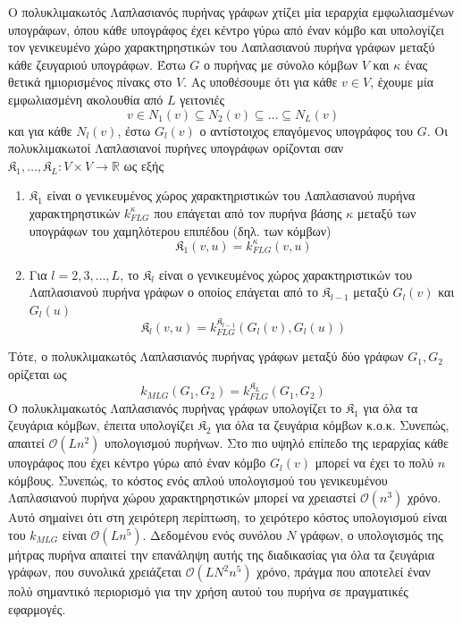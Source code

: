 Ο πολυκλιμακωτός Λαπλασιανός πυρήνας γράφων χτίζει μία ιεραρχία εμφωλιασμένων υπογράφων, όπου κάθε υπογράφος έχει κέντρο γύρω από έναν κόμβο και υπολογίζει τον γενικευμένο χώρο χαρακτηρηστικών του Λαπλασιανού πυρήνα γράφων μεταξύ κάθε ζευγαριού υπογράφων.
Έστω $G$ ο πυρήνας με σύνολο κόμβων $V$ και $\kappa$ ένας θετικά ημιορισμένος πίνακς στο $V$.
Ας υποθέσουμε ότι για κάθε $v \in V$, έχουμε μία εμφωλιασμένη ακολουθία από $L$ γειτονιές
\begin{equation*}
    v \in N_1(v) \subseteq N_2(v) \subseteq \ldots \subseteq N_L(v)
\end{equation*}
και για κάθε $N_l(v)$, έστω $G_l(v)$ ο αντίστοιχος επαγόμενος υπογράφος του $G$.
Οι πολυκλιμακωτοί Λαπλασιανοί πυρήνες υπογράφων ορίζονται σαν $\mathfrak{K}_1, \ldots, \mathfrak{K}_L : V \times V \rightarrow \mathbb{R}$ ως εξής
\begin{enumerate}
    \item $\mathfrak{K}_1$ είναι ο γενικευμένος χώρος χαρακτηριστικών του Λαπλασιανού πυρήνα χαρακτηρηστικών $k_{FLG}^\kappa$ που επάγεται από τον πυρήνα βάσης $\kappa$ μεταξύ των υπογράφων του χαμηλότερου επιπέδου (δηλ. των κόμβων)
    \begin{equation*}
        \mathfrak{K}_1(v,u) = k_{FLG}^\kappa(v, u)
    \end{equation*}
    \item Για $l=2,3,\ldots,L$, το $\mathfrak{K}_l$ είναι ο γενικευμένος χώρος χαρακτηριστικών  του Λαπλασιανού πυρήνα γράφων ο οποίος επάγεται από το  $\mathfrak{K}_{l-1}$ μεταξύ  $G_l(v)$ και $G_l(u)$
    \begin{equation*}
        \mathfrak{K}_l(v,u) = k_{FLG}^{\mathfrak{K}_{l-1}}(G_l(v), G_l(u))
    \end{equation*}
\end{enumerate}
Τότε, ο πολυκλιμακωτός Λαπλασιανός πυρήνας γράφων μεταξύ δύο γράφων $G_1, G_2$ ορίζεται ως
\begin{equation*}
    k_{MLG}(G_1, G_2) = k_{FLG}^{\mathfrak{K}_L}(G_1, G_2)
\end{equation*}
Ο πολυκλιμακωτός Λαπλασιανός πυρήνας γράφων υπολογίζει το $\mathfrak{K}_1$ για όλα τα ζευγάρια κόμβων, έπειτα υπολογίζει $\mathfrak{K}_2$ για όλα τα ζευγάρια κόμβων κ.ο.κ.
Συνεπώς, απαιτεί $\mathcal{O}(Ln^2)$ υπολογισμού πυρήνων.
Στο πιο υψηλό επίπεδο της ιεραρχίας κάθε υπογράφος που έχει κέντρο γύρω από έναν κόμβο $G_l(v)$ μπορεί να έχει το πολύ $n$ κόμβους.
Συνεπώς, το κόστος ενός απλού υπολογισμού του γενικευμένου Λαπλασιανού πυρήνα χώρου χαρακτηρηστικών μπορεί να χρειαστεί $\mathcal{O}(n^3)$ χρόνο.
Αυτό σημαίνει ότι στη χειρότερη περίπτωση, το χειρότερο κόστος υπολογισμού είναι του $k_{MLG}$ είναι $\mathcal{O}(Ln^5)$.
Δεδομένου ενός συνόλου $N$ γράφων, ο υπολογισμός της μήτρας πυρήνα απαιτεί την επανάληψη αυτής της διαδικασίας για όλα τα ζευγάρια γράφων, που συνολικά χρειάζεται $\mathcal{O}(LN^2n^5)$ χρόνο, πράγμα που αποτελεί έναν πολύ σημαντικό περιορισμό για την χρήση αυτού του πυρήνα σε πραγματικές εφαρμογές.

